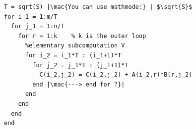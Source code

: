 \documentclass[sigplan,review,anonymous]{acmart}\settopmatter{printfolios=true,printccs=false,printacmref=false}
\newcommand\greg[1]{\textcolor{blue}{[Greg: #1]}}
\newcommand\mac[1]{\textcolor{red}{[Mac: #1]}}
\begin{document}
\begin{lstlisting}[float=h, caption=Pseudocode of I/O optimal sequential MMM, 
label=lst:pseudocode]
T = sqrt(S) |\mac{You can use mathmode:} | $\sqrt{S}$
for i_1 = 1:m/T
  for j_1 = 1:n/T
    for r = 1:k    % k is the outer loop
      %elementary subcomputation V
      for i_2 = i_1*T : (i_1+1)*T
        for j_2 = j_1*T : (j_1+1)*T
          C(i_2,j_2) = C(i_2,j_2) + A(i_2,r)*B(r,j_2)
        end |\mac{---> end for ?}|
      end
    end
  end
end
 \end{lstlisting}
 
%
%
%
%
\end{document}

